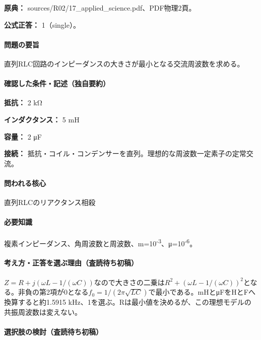 \noindent\textbf{原典：} sources/R02/17\_applied\_science.pdf、PDF物理2頁。

\textbf{公式正答：} 1（single）。

\paragraph{問題の要旨} 直列RLC回路のインピーダンスの大きさが最小となる交流周波数を求める。

\paragraph{確認した条件・記述（独自要約）}\mbox{}\par

\noindent\textbf{抵抗：} 2 kΩ\par

\noindent\textbf{インダクタンス：} 5 mH\par

\noindent\textbf{容量：} 2 μF\par

\noindent\textbf{接続：} 抵抗・コイル・コンデンサーを直列。理想的な周波数一定素子の定常交流。\par

\paragraph{問われる核心} 直列RLCのリアクタンス相殺

\paragraph{必要知識} 複素インピーダンス、角周波数と周波数、m=\allowbreak{}10\textsuperscript{-3}、μ=10\textsuperscript{-6}。

\paragraph{考え方・正答を選ぶ理由（査読待ち初稿）} \(Z=R+j(\omega L-1/(\omega C))\)なので大きさの二乗は\(R^2+(\omega L-1/(\omega C))^2\)となる。非負の第2項が0となる\(f_0=1/(2\pi\sqrt{LC})\)で最小である。mHとμFをHとFへ換算すると約1.5915 kHz、1を選ぶ。Rは最小値を決めるが、この理想モデルの共振周波数は変えない。

\paragraph{選択肢の検討（査読待ち初稿）}\mbox{}\par

